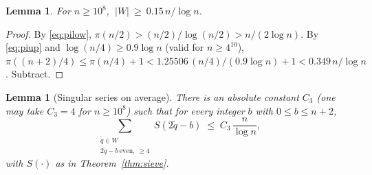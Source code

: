 \documentclass[11pt]{amsart}
\numberwithin{equation}{section}
\newtheorem{lemma}[theorem]{Lemma}
\theoremstyle{remark}
\begin{document}
\begin{lemma}\label{lem:Wsize}
For $n\ge 10^8$, $\ |W|\ \ge\ 0.15\,n/\log n$.
\end{lemma}

\begin{proof}
By \eqref{eq:pilow}, $\pi(n/2)>(n/2)/\log(n/2)>n/(2\log n)$. By \eqref{eq:piup}
and $\log(n/4)\ge 0.9\log n$ (valid for $n\ge 4^{10}$),
$\pi((n+2)/4)\le\pi(n/4)+1<1.25506\,(n/4)/(0.9\log n)+1<0.349\,n/\log n$.
Subtract.
\end{proof}

\begin{lemma}[Singular series on average]\label{lem:avg}
There is an absolute constant $C_3$ (one may take $C_3=4$ for $n\ge 10^8$) such
that for every integer $b$ with $0\le b\le n+2$,
\[
\sum_{\substack{\tilde q\in W\\ 2\tilde q-b\ \mathrm{even},\ \ge 4}}
S(2\tilde q-b)\;\le\;C_3\,\frac{n}{\log n},
\]
with $S(\cdot)$ as in Theorem~\ref{thm:sieve}.
\end{lemma}
\end{document}

